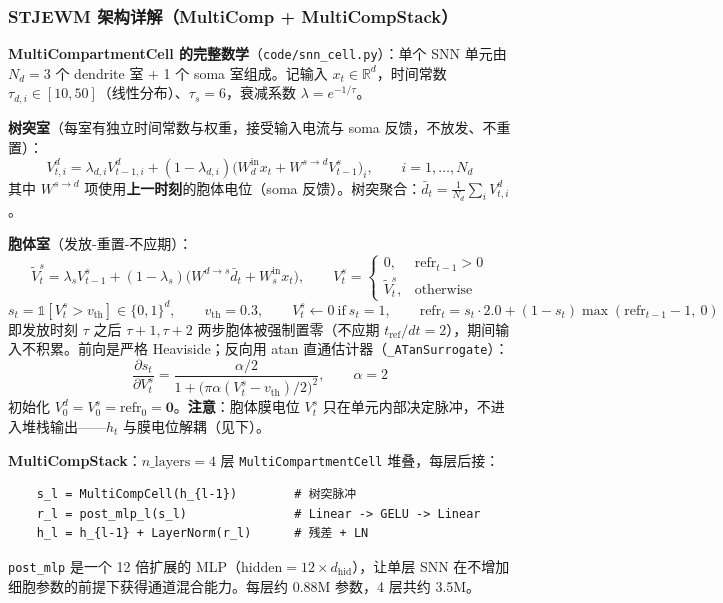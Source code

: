 \documentclass[11pt,a4paper]{article}
\begin{document}
\subsubsection{STJEWM 架构详解（MultiComp + MultiCompStack）}

\textbf{MultiCompartmentCell 的完整数学}（\texttt{code/snn\_cell.py}）：单个 SNN 单元由 $N_d = 3$ 个 dendrite 室 + 1 个 soma 室组成。记输入 $x_t \in \mathbb{R}^d$，时间常数 $\tau_{d,i} \in [10, 50]$（线性分布）、$\tau_s = 6$，衰减系数 $\lambda = e^{-1/\tau}$。

\textbf{树突室}（每室有独立时间常数与权重，接受输入电流与 soma 反馈，不放发、不重置）：
\[
V^{d}_{t,i} = \lambda_{d,i} V^{d}_{t-1,i} + (1-\lambda_{d,i})\big(W^{\text{in}}_d x_t + W^{s\to d} V^{s}_{t-1}\big)_i,\qquad i = 1,\ldots,N_d
\]
其中 $W^{s\to d}$ 项使用\textbf{上一时刻}的胞体电位（soma 反馈）。树突聚合：$\bar d_t = \tfrac{1}{N_d}\sum_i V^{d}_{t,i}$。

\textbf{胞体室}（发放-重置-不应期）：
\[
\tilde V^{s}_t = \lambda_s V^{s}_{t-1} + (1-\lambda_s)\big(W^{d\to s}\bar d_t + W^{\text{in}}_s x_t\big),\qquad
V^{s}_t = \begin{cases} 0, & \mathrm{refr}_{t-1} > 0 \\ \tilde V^{s}_t, & \text{otherwise} \end{cases}
\]
\[
s_t = \mathbb{1}[V^{s}_t > v_{\text{th}}] \in \{0,1\}^d,\qquad v_{\text{th}} = 0.3,\qquad
V^{s}_t \leftarrow 0 \ \text{if}\ s_t = 1,\qquad
\mathrm{refr}_t = s_t \cdot 2.0 + (1-s_t)\max(\mathrm{refr}_{t-1} - 1,\ 0)
\]
即发放时刻 $\tau$ 之后 $\tau{+}1,\tau{+}2$ 两步胞体被强制置零（不应期 $t_{\text{ref}}/dt = 2$），期间输入不积累。前向是严格 Heaviside；反向用 atan 直通估计器（\texttt{\_ATanSurrogate}）：
\[
\frac{\partial s_t}{\partial V^{s}_t} = \frac{\alpha/2}{1 + \big(\pi\alpha (V^{s}_t - v_{\text{th}})/2\big)^2},\qquad \alpha = 2
\]
初始化 $V^{d}_0 = V^{s}_0 = \mathrm{refr}_0 = \mathbf 0$。\textbf{注意}：胞体膜电位 $V^{s}_t$ 只在单元内部决定脉冲，不进入堆栈输出——$h_t$ 与膜电位解耦（见下）。

\textbf{MultiCompStack}：$n\_\text{layers} = 4$ 层 \texttt{MultiCompartmentCell} 堆叠，每层后接：
\begin{verbatim}
    s_l = MultiCompCell(h_{l-1})        # 树突脉冲
    r_l = post_mlp_l(s_l)               # Linear -> GELU -> Linear
    h_l = h_{l-1} + LayerNorm(r_l)      # 残差 + LN
\end{verbatim}
\texttt{post\_mlp} 是一个 12 倍扩展的 MLP（$\text{hidden} = 12 \times d_\text{hid}$），让单层 SNN 在不增加细胞参数的前提下获得通道混合能力。每层约 0.88M 参数，4 层共约 3.5M。
\end{document}
